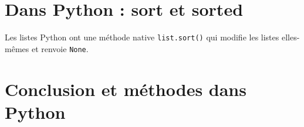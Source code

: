 \section{Dans Python : sort et sorted}
Les listes Python ont une méthode native \texttt{list.sort()} qui modifie les listes elles-mêmes et renvoie \texttt{None}.
%
%
%
%
%
%
%
%		
%
%
%


\section{Conclusion et méthodes dans Python}


